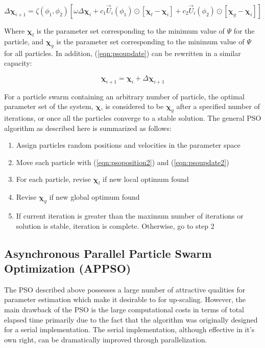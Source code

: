 \begin{equation}
\Delta\boldsymbol{\chi}_{i+1} = \zeta\left(\phi_1, \phi_2\right) \left[\omega\Delta\boldsymbol{\chi}_{i} + c_1\vec{U}_i\left(\phi_1\right)\odot\left[\boldsymbol{\chi}_l-\boldsymbol{\chi}_i\right] + c_2\vec{U}_i\left(\phi_2\right)\odot\left[\boldsymbol{\chi}_g-\boldsymbol{\chi}_i\right]\right]
\label{eqn:psoposition2}
\end{equation}

Where $\boldsymbol{\chi}_l$ is the parameter set corresponding to the minimum value of $\Psi$ for the particle, and $\boldsymbol{\chi}_g$ is the parameter set corresponding to the minimum value of $\Psi$ for all particles. In addition, (\ref{eqn:psoupdate}) can be rewritten in a similar capacity:

\begin{equation}
\boldsymbol{\chi}_{i+1}  = \boldsymbol{\chi}_{i}  +  \Delta\boldsymbol{\chi}_{i+1}
\label{eqn:psoupdate2}
\end{equation}

For a particle swarm containing an arbitrary number of particle, the optimal parameter set of the system, $\boldsymbol{\chi}$, is  considered to be $\boldsymbol{\chi}_g$ after a specified number of iterations, or once all the particles converge to a stable solution. The general PSO algorithm as described here is summarized as follows:

\begin{enumerate}
\item Assign particles random positions and velocities in the parameter space
\item Move each particle with (\ref{eqn:psoposition2}) and (\ref{eqn:psoupdate2})
\item For each particle, revise $\boldsymbol{\chi}_l$ if new local optimum found
\item Revise $\boldsymbol{\chi}_g$ if new global optimum found
\item If current iteration is greater than the maximum number of iterations or solution is stable, iteration is complete. Otherwise, go to step 2
\end{enumerate}

\subsection{Asynchronous Parallel Particle Swarm Optimization (APPSO)}

The PSO described above possesses a large number of attractive qualities for parameter estimation which make it desirable to for up-scaling.  However, the main drawback of the PSO is the large computational costs in terms of total elapsed time primarily due to the fact that the algorithm was originally designed for a serial implementation. The serial implementation, although effective in it's own right, can be dramatically improved through parallelization. 

